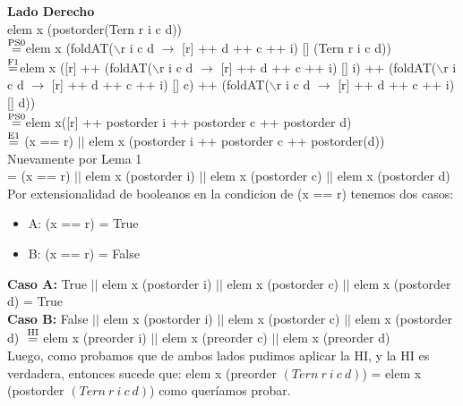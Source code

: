 \documentclass{article}
\begin{document}
\textbf{Lado Derecho} \\
elem x (postorder(Tern r i c d)) \\
$\stackrel{\text{PS0}}{=}$elem x (foldAT($\backslash$r i c d $\rightarrow$ [r] ++ d ++ c ++ i) [] (Tern r i c d))    \\
$\stackrel{\text{F1}}{=}$elem x ([r] ++ (foldAT($\backslash$r i c d $\rightarrow$ [r] ++ d ++ c ++ i) [] i) ++ (foldAT($\backslash$r i c d $\rightarrow$ [r] ++ d ++ c ++ i) [] c) ++ (foldAT($\backslash$r i c d $\rightarrow$ [r] ++ d ++ c ++ i) [] d)) \\
$\stackrel{\text{PS0}}{=}$elem x([r] ++ postorder i ++ postorder c ++ postorder d) \\
$\stackrel{\text{E1}}{=}$ (x == r) $||$ elem x (postorder i ++ postorder c ++ postorder(d)) \\
Nuevamente por Lema 1 \\
= (x == r) $||$ elem x (postorder i) $||$ elem x (postorder c) $||$ elem x (postorder d)\\
Por extensionalidad de booleanos en la condicion de (x == r) tenemos dos casos:
\begin{itemize}
    \item A: (x == r) = True
    \item B: (x == r) = False
\end{itemize}
\textbf{Caso A:} True $||$ elem x (postorder i) $||$ elem x (postorder c) $||$ elem x (postorder d) = True \\
\textbf{Caso B:} False $||$ elem x (postorder i) $||$ elem x (postorder c) $||$ elem x (postorder d) $\\ \stackrel{\text{HI}}{=} $  elem x (preorder i) $||$ elem x (preorder c) $||$ elem x (preorder d) \\
Luego, como probamos que de ambos lados pudimos aplicar la HI, y la HI es verdadera, entonces sucede que: elem x (preorder $(Tern \ r \ i \ c \ d)$) = elem x (postorder $(Tern \ r \ i \ c \ d)$) como queríamos probar. \\
\end{document}
